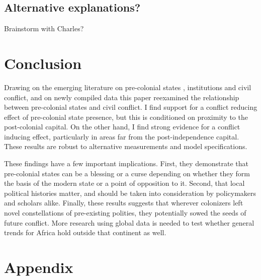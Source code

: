 \documentclass[12pt]{article}
\begin{document}

\subsection{Alternative explanations?}

Brainstorm with Charles?

\section{Conclusion}

Drawing on the emerging literature on pre-colonial states \citep{Paine2019,
Depetris-Chauvin2016}, institutions \citep{Wig2016, Englebert2002,
Michalopoulos2018} and civil conflict, and on newly compiled data this paper
reexamined the relationship between pre-colonial states and civil conflict. I
find support for a conflict reducing effect of pre-colonial state presence, but
this is conditioned on proximity to the post-colonial capital. On the other
hand, I find strong evidence for a conflict inducing effect, particularly in
areas far from the post-independence capital. These results are robust to
alternative measurements and model specifications.

These findings have a few important implications. First, they demonstrate that
pre-colonial states can be a blessing or a curse depending on whether they form
the basis of the modern state or a point of opposition to it. Second, that local
political histories matter, and should be taken into consideration by
policymakers and scholars alike. Finally, these results suggests that wherever
colonizers left novel constellations of pre-existing polities, they potentially
sowed the seeds of future conflict. More research using global data is needed to
test whether general trends for Africa hold outside that continent as well.


\pagebreak




\pagebreak
\section*{Appendix}






\end{document}
